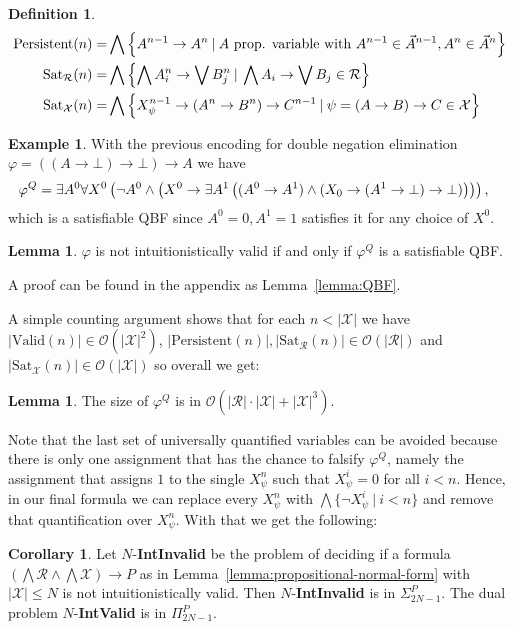 \documentclass{easychair}
\theoremstyle{definition}
\theoremstyle{definition}
\newtheorem{corollary}[theorem]{Corollary}
\theoremstyle{definition}
\newtheorem{lemma}[theorem]{Lemma}
\theoremstyle{definition}
\theoremstyle{definition}
\newtheorem{definition}[theorem]{Definition}
\theoremstyle{definition}
\newtheorem{example}[theorem]{Example}
\theoremstyle{definition}
\begin{document}
\begin{definition}
\begin{align*}
		\text{\normalfont Persistent}(n) = & \bigwedge\left\{A^{n-1}\to A^n\:|\: A \text{ prop. variable with }A^{n-1}\in\vec A^{n-1}, A^n \in\vec A^{n}\right\}\\
		\text{\normalfont Sat}_{\mathcal R}(n) = &\bigwedge\left\{\bigwedge A^n_i\to\bigvee B^n_j\:|\:\bigwedge A_i\to\bigvee B_j \in \mathcal R\right\}\\
		\text{\normalfont Sat}_{\mathcal X}(n) = & \bigwedge\left\{X^{n-1}_\psi\to (A^n\to B^n)\to C^{n-1}\:|\:\psi = (A\to B)\to C\in\mathcal X\right\}
	\end{align*}
\end{definition}

\begin{example}
	With the previous encoding for double negation elimination $\varphi = ((A\to \bot)\to \bot)\to A$ we have
	$$\hspace*{-.3cm}
	\varphi^Q = \exists A^0\forall X^0\left(\neg A^0\wedge\left(X^0\to \exists A^1\left((A^0\to A^1)\wedge(X_0\to (A^1\to \bot)\to \bot)\right)\right)\right),
	$$
	which is a satisfiable QBF since $A^0 = 0, A^1 = 1$ satisfies it for any choice of $X^0$.
\end{example}


\begin{lemma}
	$\varphi$ is not intuitionistically valid if and only if $\varphi^Q$ is a satisfiable QBF.
\end{lemma}
A proof can be found in the appendix as Lemma~\ref{lemma:QBF}.

A simple counting argument shows that for each $n < |\mathcal X|$ we have $|\text{Valid}(n)|\in \mathcal O(|\mathcal X|^2)$, $|\text{Persistent}(n)|, |\text{Sat}_{\mathcal R}(n)|\in \mathcal O(|\mathcal R|)$ and $|\text{Sat}_{\mathcal X}(n)|\in \mathcal O(|\mathcal X|)$ so overall we get:
\begin{lemma}
	The size of $\varphi^Q$ is in $\mathcal O(|\mathcal R|\cdot|\mathcal X| + |\mathcal X|^3)$.
\end{lemma}

Note that the last set of universally quantified variables can be avoided because there is only one assignment that has the chance to falsify $\varphi^Q$, namely the assignment that assigns $1$ to the single $X_\psi^n$ such that $X_\psi^i = 0$ for all $i < n$. Hence, in our final formula we can replace every $X_\psi^n$ with $\bigwedge\{\neg X_\psi^i\:|\:i < n\}$ and remove that quantification over $X_\psi^n$. With that we get the following:

\begin{corollary}
	Let $N$-\textbf{IntInvalid} be the problem of deciding if a formula $(\bigwedge \mathcal R\wedge\bigwedge\mathcal X)\to P$ as in Lemma~\ref{lemma:propositional-normal-form} with $|\mathcal X|\leq N$ is not intuitionistically valid. Then $N$-\textbf{IntInvalid} is in $\Sigma_{2N-1}^P$. The dual problem $N$-\textbf{IntValid} is in $\Pi_{2N-1}^P$.
\end{corollary}
\end{document}
